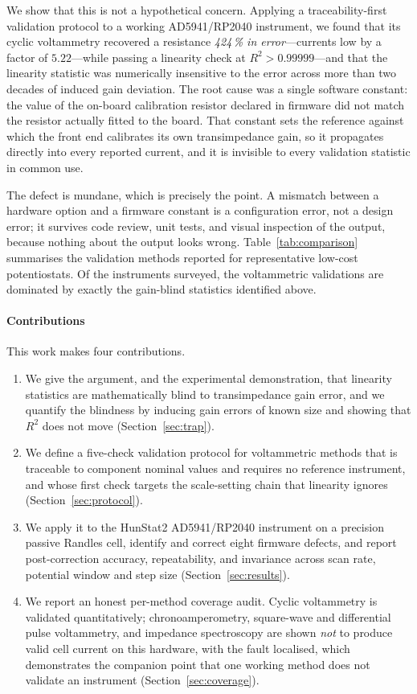 We show that this is not a hypothetical concern. Applying a traceability-first
validation protocol to a working AD5941/RP2040 instrument, we found that its
cyclic voltammetry recovered a resistance \emph{424\,\% in error}---currents low
by a factor of $5.22$---while passing a
linearity check at $R^2 > 0.99999$---and that the linearity statistic was
numerically insensitive to the error across more than two decades of induced
gain deviation. The root cause was a single software constant: the value of the
on-board calibration resistor declared in firmware did not match the resistor
actually fitted to the board. That constant sets the reference against which the
front end calibrates its own transimpedance gain, so it propagates directly into
every reported current, and it is invisible to every validation statistic in
common use.

The defect is mundane, which is precisely the point. A mismatch between a
hardware option and a firmware constant is a configuration error, not a design
error; it survives code review, unit tests, and visual inspection of the output,
because nothing about the output looks wrong. Table~\ref{tab:comparison}
summarises the validation methods reported for representative low-cost
potentiostats. Of the instruments surveyed, the voltammetric validations are
dominated by exactly the gain-blind statistics identified above.

\paragraph{Contributions} This work makes four contributions.
\begin{enumerate}
\item We give the argument, and the experimental demonstration, that linearity
  statistics are mathematically blind to transimpedance gain error, and we
  quantify the blindness by inducing gain errors of known size and showing that
  $R^2$ does not move (Section~\ref{sec:trap}).
\item We define a five-check validation protocol for voltammetric methods that
  is traceable to component nominal values and requires no reference instrument,
  and whose first check targets the scale-setting chain that linearity ignores
  (Section~\ref{sec:protocol}).
\item We apply it to the HunStat2 AD5941/RP2040 instrument on a precision
  passive Randles cell, identify and correct eight firmware defects, and report
  post-correction accuracy, repeatability, and invariance across scan rate,
  potential window and step size (Section~\ref{sec:results}).
\item We report an honest per-method coverage audit. Cyclic voltammetry is
  validated quantitatively; chronoamperometry, square-wave and differential
  pulse voltammetry, and impedance spectroscopy are shown \emph{not} to produce
  valid cell current on this hardware, with the fault localised, which
  demonstrates the companion point that one working method does not validate an
  instrument (Section~\ref{sec:coverage}).
\end{enumerate}

